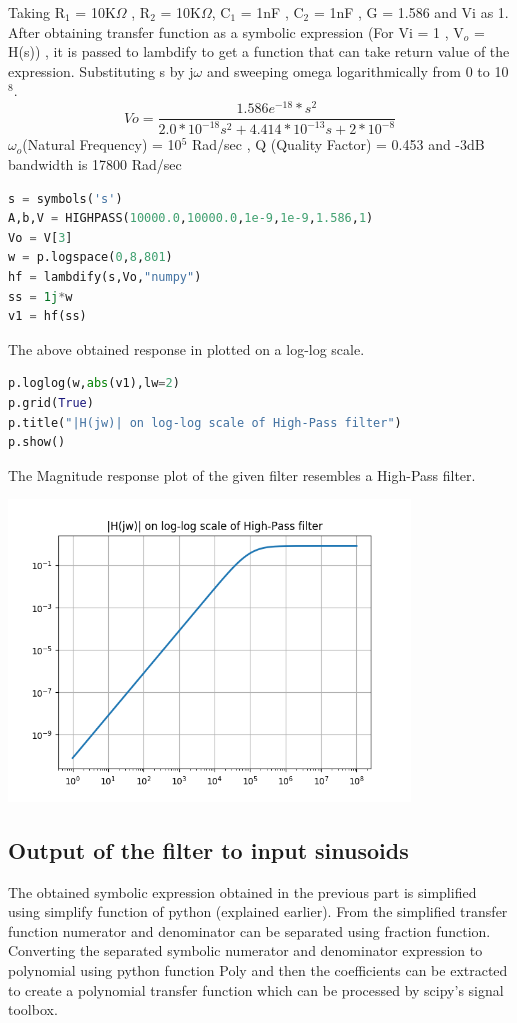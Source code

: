 \documentclass[a4paper]{article}
\begin{document}
Taking R$_{1}$ = 10K$\Omega$ , R$_{2}$ = 10K$\Omega$, C$_{1}$ = 1nF , C$_{2}$ = 1nF , G = 1.586 and Vi as 1. After obtaining transfer function as a symbolic expression (For Vi = 1 , V$_{o}$ = H(s)) , it is passed to lambdify to get a function that can take return value of the expression. Substituting s by j$\omega$ and sweeping omega logarithmically from 0 to 10$^{8}$.
$$ Vo = \frac{1.586e^{-18}*s^{2}}{2.0*10^{-18}s^{2} + 4.414*10^{-13}s + 2*10^{-8}}$$
$\omega$$_{o}$(Natural Frequency) = 10$^{5}$ Rad/sec
, Q (Quality Factor) =  0.453
and -3dB bandwidth is 17800 Rad/sec
\begin{lstlisting}[language=Python]
s = symbols('s')
A,b,V = HIGHPASS(10000.0,10000.0,1e-9,1e-9,1.586,1)
Vo = V[3]
w = p.logspace(0,8,801)
hf = lambdify(s,Vo,"numpy")
ss = 1j*w
v1 = hf(ss)
\end{lstlisting}
The above obtained response in plotted on a log-log scale.
\begin{lstlisting}[language=Python]
p.loglog(w,abs(v1),lw=2)
p.grid(True)
p.title("|H(jw)| on log-log scale of High-Pass filter")
p.show()
\end{lstlisting}
The Magnitude response plot of the given filter resembles a High-Pass filter.
\begin{center}
\includegraphics[width=0.8\textwidth]{Figure_3.png}
\end{center}
\subsection{Output of the filter to input sinusoids}
The obtained symbolic expression obtained in the previous part is simplified using  simplify function of python (explained earlier). 
From the simplified transfer function numerator and denominator can be separated using  fraction function. Converting the separated symbolic numerator and denominator expression to polynomial using python function 
Poly and then the coefficients can be extracted to create a polynomial transfer function which can be processed by scipy's signal toolbox.
\end{document}

